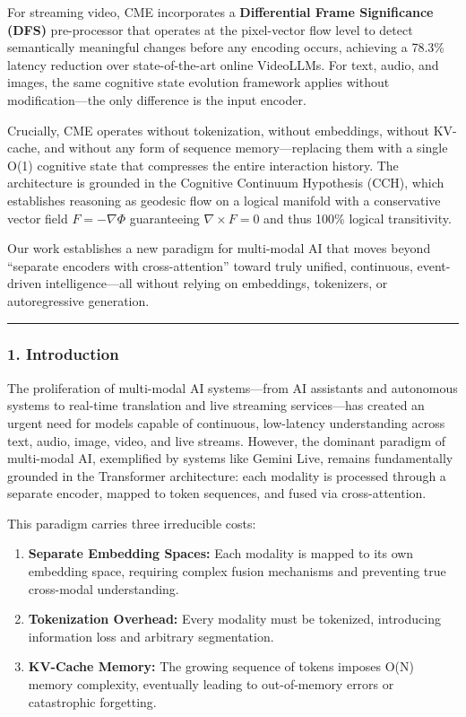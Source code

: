\documentclass[
  11pt,
  a4paper,
]{article}
\providecommand{\tightlist}{%
  \setlength{\itemsep}{0pt}\setlength{\parskip}{0pt}}
\begin{document}
For streaming video, CME incorporates a \textbf{Differential Frame
Significance (DFS)} pre-processor that operates at the pixel-vector flow
level to detect semantically meaningful changes before any encoding
occurs, achieving a 78.3\% latency reduction over state-of-the-art
online VideoLLMs. For text, audio, and images, the same cognitive state
evolution framework applies without modification---the only difference
is the input encoder.

Crucially, CME operates without tokenization, without embeddings,
without KV-cache, and without any form of sequence memory---replacing
them with a single O(1) cognitive state that compresses the entire
interaction history. The architecture is grounded in the Cognitive
Continuum Hypothesis (CCH), which establishes reasoning as geodesic flow
on a logical manifold with a conservative vector field
\(F = -\nabla\Phi\) guaranteeing \(\nabla \times F = 0\) and thus 100\%
logical transitivity.

Our work establishes a new paradigm for multi-modal AI that moves beyond
``separate encoders with cross-attention'' toward truly unified,
continuous, event-driven intelligence---all without relying on
embeddings, tokenizers, or autoregressive generation.

\begin{center}\rule{0.5\linewidth}{0.5pt}\end{center}

\subsubsection{1. Introduction}\label{introduction-3}

The proliferation of multi-modal AI systems---from AI assistants and
autonomous systems to real-time translation and live streaming
services---has created an urgent need for models capable of continuous,
low-latency understanding across text, audio, image, video, and live
streams. However, the dominant paradigm of multi-modal AI, exemplified
by systems like Gemini Live, remains fundamentally grounded in the
Transformer architecture: each modality is processed through a separate
encoder, mapped to token sequences, and fused via cross-attention.

This paradigm carries three irreducible costs:

\begin{enumerate}
\def\labelenumi{\arabic{enumi}.}
\tightlist
\item
  \textbf{Separate Embedding Spaces:} Each modality is mapped to its own
  embedding space, requiring complex fusion mechanisms and preventing
  true cross-modal understanding.
\item
  \textbf{Tokenization Overhead:} Every modality must be tokenized,
  introducing information loss and arbitrary segmentation.
\item
  \textbf{KV-Cache Memory:} The growing sequence of tokens imposes O(N)
  memory complexity, eventually leading to out-of-memory errors or
  catastrophic forgetting.
\end{enumerate}
\end{document}
